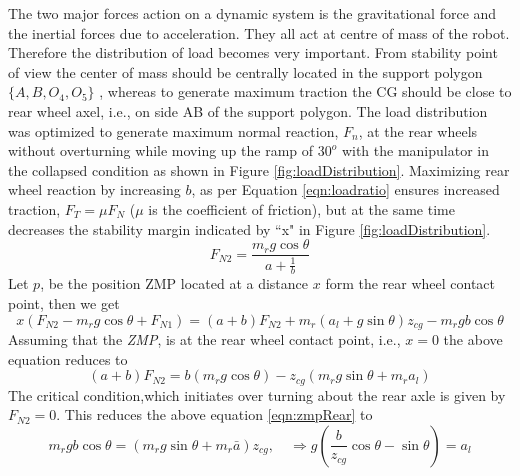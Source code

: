   The two major forces action on a dynamic system is the gravitational force and the inertial forces due to acceleration. They all act at centre of mass of the robot. Therefore the distribution of load becomes very important. From stability point of view the center of mass should be centrally located in the support polygon $\{A, B,O_4,O_5\}$ , whereas to generate maximum traction the CG should be close to rear wheel axel, i.e., on side AB  of the support polygon. 
  The load distribution was optimized to generate maximum normal reaction, $F_n$,  at the rear wheels without overturning while moving up the ramp of $30^o$ with the manipulator in the collapsed condition as shown in Figure  \ref{fig:loadDistribution}. Maximizing rear wheel reaction by increasing $b$, as per Equation \ref{eqn:loadratio} ensures increased traction, $F_T=\mu F_N$ ($\mu$ is the coefficient of friction), but at the same time decreases the stability margin indicated by ``x" in Figure \ref{fig:loadDistribution}.
  \begin{equation}
  \label{eqn:loadratio}
  F_{N2}=\frac{m_rg\cos\theta}{a+\frac{1}{b}}
  \end{equation}
  Let $p$, be the position ZMP located at a distance $x$ form the rear wheel contact point, then we get
  \begin{equation}
  \label{eqn:zmpRARS}
  x(F_{N2}-m_r g \cos \theta+F_{N1})=(a+b)F_{N2}+ m_r (a_l +g \sin \theta )z_{cg} -m_r g b \cos\theta
  \end{equation}
   Assuming that the \textit{ZMP}, is at the rear wheel contact point, i.e., $x=0$ the above equation reduces to
\begin{equation}
\label{eqn:zmpRear}
(a+b)F_{N2}=b(m_r g\cos\theta)-z_{cg}(m_r g\sin\theta+m_r a_l)
\end{equation}
The critical condition,which  initiates over turning about the rear axle is given by $F_{N2} =0$.  This reduces the above equation \ref{eqn:zmpRear} to 
\begin{equation}
\label{eqn:overturn}
m_rgb\cos\theta=(m_rg\sin\theta+m_r \bar a)z_{cg}, \quad \Rightarrow g(\frac{b}{z_{cg}}\cos\theta-\sin\theta)= a_l
\end{equation}

 

